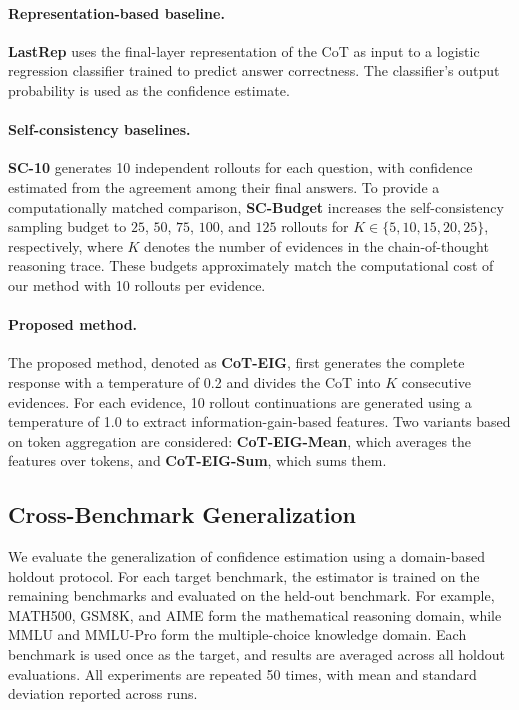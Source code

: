 \documentclass{article} %
\begin{document}
\paragraph{Representation-based baseline.}
\textbf{LastRep} uses the final-layer representation of the CoT as input to a logistic regression classifier trained to predict answer correctness. The classifier's output probability is used as the confidence estimate.

\paragraph{Self-consistency baselines.}
\textbf{SC-10} generates 10 independent rollouts for each question, with confidence estimated from the agreement among their final answers. To provide a computationally matched comparison, \textbf{SC-Budget} increases the self-consistency sampling budget to $25$, $50$, $75$, $100$, and $125$ rollouts for $K \in \{5,10,15,20,25\}$, respectively, where $K$ denotes the number of evidences in the chain-of-thought reasoning trace. These budgets approximately match the computational cost of our method with 10 rollouts per evidence.

\paragraph{Proposed method.}
The proposed method, denoted as \textbf{CoT-EIG}, first generates the complete response with a temperature of 0.2 and divides the CoT into $K$ consecutive evidences. For each evidence, 10 rollout continuations are generated using a temperature of 1.0 to extract information-gain-based features. Two variants based on token aggregation are considered: \textbf{CoT-EIG-Mean}, which averages the features over tokens, and \textbf{CoT-EIG-Sum}, which sums them.



\subsection{Cross-Benchmark Generalization}
\label{sec:cross_benchmark_generalization}
We evaluate the generalization of confidence estimation using a domain-based holdout protocol. For each target benchmark, the estimator is trained on the remaining benchmarks and evaluated on the held-out benchmark. For example, MATH500, GSM8K, and AIME form the mathematical reasoning domain, while MMLU and MMLU-Pro form the multiple-choice knowledge domain. Each benchmark is used once as the target, and results are averaged across all holdout evaluations. All experiments are repeated 50 times, with mean and standard deviation reported across runs.
\end{document}
